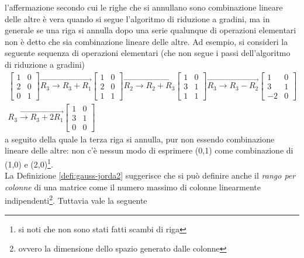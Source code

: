 \begin{oss}
  \label{oss:gauss-jorda3}
  l'affermazione secondo cui le righe che si annullano sono combinazione
  lineare delle altre è vera quando si segue l'algoritmo di riduzione
  a gradini, ma in generale se una riga si annulla dopo una serie
  qualunque di operazioni elementari non è detto che sia combinazione
  lineare delle altre. Ad esempio, si consideri la seguente sequenza di
  operazioni elementari (che non segue i passi dell'algoritmo di
  riduzione a gradini)
  \begin{eqnarray*}
    \begin{bmatrix}
      1 & 0\\
      2 & 0\\
      0 & 1
    \end{bmatrix} \overrightarrow{
      R_3\to R_3+R_1
    }
    \begin{bmatrix}
      1 & 0 \\
      2 & 0 \\
      1 & 1
    \end{bmatrix}
    \overrightarrow{R_2\to R_2+R_3}
    \begin{bmatrix}
      1 & 0\\
      3 & 1\\
      1 & 1
    \end{bmatrix}\overrightarrow{R_3\to R_3-R_2}
    \begin{bmatrix}
      1 & 0 \\
      3 & 1 \\
      -2 & 0
    \end{bmatrix}\\
    \overrightarrow{R_3\to R_3+2R_1}
    \begin{bmatrix}
      1 & 0\\
      3 & 1\\
      0 & 0
    \end{bmatrix}
  \end{eqnarray*}
  a seguito della quale la terza riga si annulla, pur non essendo
  combinazione lineare delle altre: non c'è nessun modo di esprimere
  (0,1) come combinazione di (1,0) e (2,0)\footnote{si noti che non sono
    stati fatti scambi di riga}.\\
  La Definizione \ref{defi:gauss-jorda2} suggerisce che si può definire
  anche il \textit{rango per colonne} di una matrice come il numero
  massimo di colonne linearmente indipendenti\footnote{ovvero la
    dimensione dello spazio generato dalle colonne}. Tuttavia vale la
  seguente
\end{oss}
